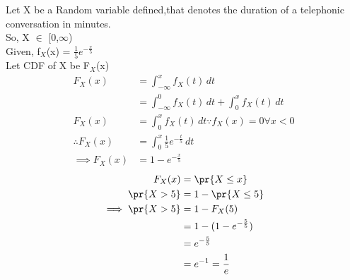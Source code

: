 
Let X be a Random variable defined,that denotes the duration of a telephonic conversation in minutes.\\
So, X $\in$ [0,$\infty$) \\
Given, f$_X$(x) = $\frac{1}{5}e^{-\frac{x}{5}}$ \\
Let CDF of X be F$_X$(x)
\begin{align*}
F_X(x) &=  \int_{-\infty}^{x}f_X(t) \,dt \\
       &= \int_{-\infty}^{0}f_X(t) \,dt + \int_{0}^{x}f_X(t) \,dt \\
F_X(x) &= \int_{0}^{x}f_X(t) \,dt  \because f_X(x) = 0 \forall x<0  \\
\therefore F_X(x) &= \int_{0}^{x}\frac{1}{5}e^{-\frac{t}{5}} \,dt \\
\tag{1}
\label{in2007-27:CDF}
\implies F_X(x) &= 1 - e^{-\frac{x}{5}}
\end{align*}
\begin{align*}
F_X(x) &= \pr{X \le x} \\
\pr{X > 5} &= 1 - \pr{X \le 5} \\
\implies \pr{X > 5} &= 1 - F_X(5) \\
 &= 1 - (1 - e^{-\frac{5}{5}}) \\
 &= e^{-\frac{5}{5}}  \\
 &= e^{-1} = \frac{1}{e}
\end{align*}